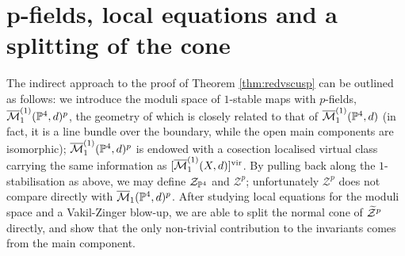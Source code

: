 \section{p-fields, local equations and a splitting of the cone}\label{sec:techniques}

The indirect approach to the proof of Theorem \ref{thm:redvscusp} can be outlined as follows: we introduce the moduli space of $1$-stable maps with $p$-fields, $\overline{\mathcal{M}}_1^{(1)}(\mathbb P^4,d)^p$, the geometry of which is closely related to that of $\overline{\mathcal{M}}_1^{(1)}(\mathbb P^4,d)$ (in fact, it is a line bundle over the boundary, while the open main components are isomorphic); $\overline{\mathcal{M}}_1^{(1)}(\mathbb P^4,d)^p$ is endowed with a cosection localised virtual class carrying the same information as $[\overline{\mathcal{M}}_1^{(1)}(X,d)]^{\mathrm{vir}}$. By pulling back along the $1$-stabilisation as above, we may define $\mathcal Z_{\mathbb P^4}$ and $\mathcal Z^p$; unfortunately $\mathcal Z^p$ does not compare directly with $\overline{\mathcal{M}}_1(\mathbb P^4,d)^p$. After studying local equations for the moduli space and a Vakil-Zinger blow-up, we are able to split the normal cone of $\widetilde{\mathcal Z}^p$ directly, and show that the only non-trivial contribution to the invariants comes from the main component.

